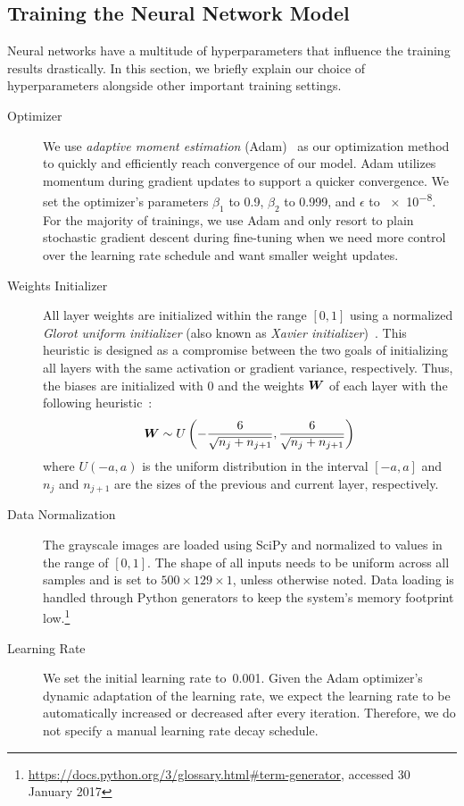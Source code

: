 \subsection{Training the Neural Network Model}
\label{sec:training}
	Neural networks have a multitude of hyperparameters that influence the training results drastically. In this section, we briefly explain our choice of hyperparameters alongside other important training settings.

	\begin{description}
	\item[Optimizer] We use \emph{adaptive moment estimation} (Adam)~\cite{kingma2014adam} as our optimization method to quickly and efficiently reach convergence of our model. Adam utilizes momentum during gradient updates to support a quicker convergence. We set the optimizer's parameters $\beta_1$ to \num{0.9}, $\beta_2$ to \num{0.999}, and $\epsilon$ to \num{e-8}. For the majority of trainings, we use Adam and only resort to plain stochastic gradient descent during fine-tuning when we need more control over the learning rate schedule and want smaller weight updates.
	\item[Weights Initializer] All layer weights are initialized within the range $[0, 1]$ using a normalized \emph{Glorot uniform initializer} (also known as \emph{Xavier initializer})~\cite{glorot2010understanding}. This heuristic is designed as a compromise between the two goals of initializing all layers with the same activation or gradient variance, respectively. Thus, the biases are initialized with \num{0} and the weights $\boldsymbol{W}$ of each layer with the following heuristic~\cite[p.~303]{Goodfellow-et-al-2016}:
	$$\boldsymbol{W} \sim U\left(-\frac{6}{\sqrt{n_j + n_{j+1}}}, \frac{6}{\sqrt{n_j + n_{j+1}}}\right)$$
	where $U(-a, a)$ is the uniform distribution in the interval $[-a, a]$ and $n_j$ and $n_{j+1}$ are the sizes of the previous and current layer, respectively.
	\item[Data Normalization] The grayscale images are loaded using SciPy and normalized to values in the range of $[0, 1]$. The shape of all inputs needs to be uniform across all samples and is set to $500 \times 129 \times 1$, unless otherwise noted. Data loading is handled through Python generators to keep the system's memory footprint low.\footnote{\url{https://docs.python.org/3/glossary.html\#term-generator}, accessed 30 January 2017}
	\item[Learning Rate] We set the initial learning rate to~\num{0.001}. Given the Adam optimizer's dynamic adaptation of the learning rate, we expect the learning rate to be automatically increased or decreased after every iteration. Therefore, we do not specify a manual learning rate decay schedule.

\end{description}
